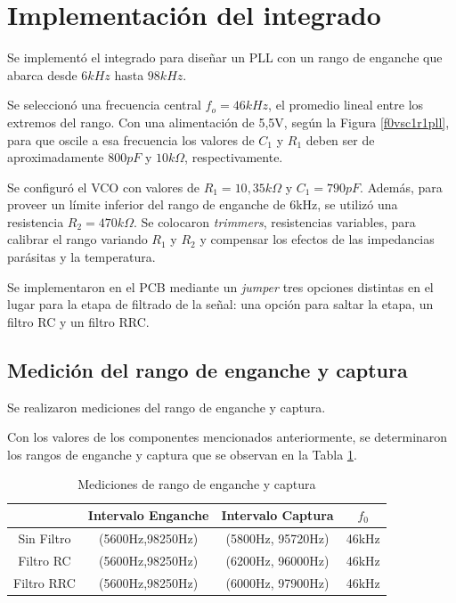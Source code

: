 \section{Implementación del integrado}
Se implementó el integrado para diseñar un PLL con un rango de enganche que abarca desde $6kHz$ hasta $98kHz$.

Se seleccionó una frecuencia central $f_{o}=46kHz$, el promedio lineal entre los extremos del rango. Con una alimentación de 5,5V, según la Figura \ref{f0vsc1r1pll}, para que oscile a esa frecuencia los valores de $C_1$ y $R_1$ deben ser de aproximadamente $800pF$ y $10k\Omega$, respectivamente.

Se configuró el VCO con valores de $R_1=10,35k\Omega$ y $C_1=790pF$. Además, para proveer un límite inferior del rango de enganche de 6kHz, se utilizó una resistencia $R_2=470k\Omega$. Se colocaron \emph{trimmers}, resistencias variables, para calibrar el rango variando $R_1$ y $R_2$ y compensar los efectos de las impedancias parásitas y la temperatura.

Se implementaron en el PCB mediante un \emph{jumper} tres opciones distintas en el lugar para la etapa de filtrado de la señal: una opción para saltar la etapa, un filtro RC y un filtro RRC.


\subsection{Medición del rango de enganche y captura}
Se realizaron mediciones del rango de enganche y captura. 

Con los valores de los componentes mencionados anteriormente, se determinaron los rangos de enganche y captura que se observan en la Tabla \ref{tablacaptura}.

\begin{table}[H]
    \centering
    \begin{tabular}{|c|c|c|c|}
    \hline
                &Intervalo Enganche  &   Intervalo Captura  & $f_{0}$   \tabularnewline
    \hline
    \hline
    Sin Filtro &    (5600Hz,98250Hz)               &      (5800Hz, 95720Hz)                 &      46kHz     \tabularnewline
    \hline
    Filtro RC  &    (5600Hz,98250Hz)               &      (6200Hz, 96000Hz)                 &      46kHz     \tabularnewline 
    \hline
    Filtro RRC &         (5600Hz,98250Hz)          &          (6000Hz, 97900Hz)             &      46kHz     \tabularnewline
    \hline
    \end{tabular}
    \caption{Mediciones de rango de enganche y captura}
    \label{tablacaptura}
\end{table}

